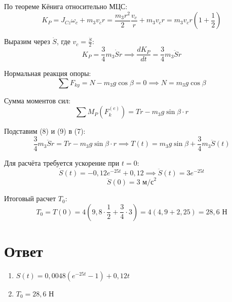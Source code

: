 \documentclass{article}
\begin{document}
По теореме Кёнига относительно МЦС:
\begin{equation*}
	K_{P} = J_{Cz} \omega_c + m_3 v_c r = \frac{m_3 r^2}{2} \frac{v_c}{r} + m_3 v_c r = m_3 v_c r \left( 1 + \frac{1}{2} \right)
\end{equation*}
\par
Выразим через $\dot{S}$, где $v_c = \frac{\dot{S}}{2}$:
\begin{equation}
	K_{P} = \frac{3}{4} m_3 \dot{S} r \implies \frac{dK_{P}}{dt} = \frac{3}{4} m_3 \ddot{S} r
\end{equation}
\par
Нормальная реакция опоры: 
\begin{equation*}
	\sum F_{ky} = N - m_3 g \cos\beta = 0 \implies N = m_3 g \cos\beta
\end{equation*}
\par
Сумма моментов сил:
\begin{equation}
	\sum M_P(F_k^{(e)}) = Tr - m_3 g \sin\beta \cdot r
\end{equation}
\par
Подставим (8) и (9) в (7):
\begin{equation*}
	\frac{3}{4} m_3 \ddot{S} r = Tr - m_3 g \sin\beta \cdot r \implies T(t) = m_3 g \sin\beta + \frac{3}{4} m_3 \ddot{S}(t)
\end{equation*}
\par
Для расчёта требуется ускорение при $t = 0$:
\begin{equation*}
	\dot{S}(t) = -0,12 e^{-25t} + 0,12 \implies \ddot{S}(t) = 3 e^{-25t} 
\end{equation*}
\begin{equation*}
	\ddot{S}(0) = 3 \text{ м/с}^2
\end{equation*}
\par
Итоговый расчет $T_0$:
\begin{equation*}
	T_0 = T(0) = 4 \left( 9,8 \cdot \frac{1}{2} + \frac{3}{4} \cdot 3 \right) = 4 (4,9 + 2,25) = 28,6 \text{ Н}
\end{equation*}
\section*{Ответ}
\begin{enumerate}[]
	\item $S(t) = 0,0048 (e^{-25t} - 1) + 0,12 t$
	\item $T_0 = 28,6 \text{ Н}$
\end{enumerate}
\end{document}
